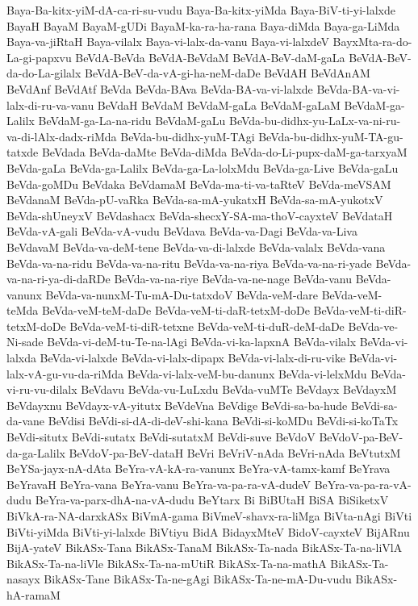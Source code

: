 {Baya-Ba-kitx-yiM-dA-ca-ri-su-vudu
Baya-Ba-kitx-yiMda
Baya-BiV-ti-yi-lalxde
BayaH
BayaM
BayaM-gUDi
BayaM-ka-ra-ha-rana
Baya-diMda
Baya-ga-LiMda
Baya-va-jiRtaH
Baya-vilalx
Baya-vi-lalx-da-vanu
Baya-vi-lalxdeV
BayxMta-ra-do-La-gi-papxvu
BeVdA-BeVda
BeVdA-BeVdaM
BeVdA-BeV-daM-gaLa
BeVdA-BeV-da-do-La-gilalx
BeVdA-BeV-da-vA-gi-ha-neM-daDe
BeVdAH
BeVdAnAM
BeVdAnf
BeVdAtf
BeVda
BeVda-BAva
BeVda-BA-va-vi-lalxde
BeVda-BA-va-vi-lalx-di-ru-va-vanu
BeVdaH
BeVdaM
BeVdaM-gaLa
BeVdaM-gaLaM
BeVdaM-ga-Lalilx
BeVdaM-ga-La-na-ridu
BeVdaM-gaLu
BeVda-bu-didhx-yu-LaLx-va-ni-ru-va-di-lAlx-dadx-riMda
BeVda-bu-didhx-yuM-TAgi
BeVda-bu-didhx-yuM-TA-gu-tatxde
BeVdada
BeVda-daMte
BeVda-diMda
BeVda-do-Li-pupx-daM-ga-tarxyaM
BeVda-gaLa
BeVda-ga-Lalilx
BeVda-ga-La-lolxMdu
BeVda-ga-Live
BeVda-gaLu
BeVda-goMDu
BeVdaka
BeVdamaM
BeVda-ma-ti-va-taRteV
BeVda-meVSAM
BeVdanaM
BeVda-pU-vaRka
BeVda-sa-mA-yukatxH
BeVda-sa-mA-yukotxV
BeVda-shUneyxV
BeVdashacx
BeVda-shecxY-SA-ma-thoV-cayxteV
BeVdataH
BeVda-vA-gali
BeVda-vA-vudu
BeVdava
BeVda-va-Dagi
BeVda-va-Liva
BeVdavaM
BeVda-va-deM-tene
BeVda-va-di-lalxde
BeVda-valalx
BeVda-vana
BeVda-va-na-ridu
BeVda-va-na-ritu
BeVda-va-na-riya
BeVda-va-na-ri-yade
BeVda-va-na-ri-ya-di-daRDe
BeVda-va-na-riye
BeVda-va-ne-nage
BeVda-vanu
BeVda-vanunx
BeVda-va-nunxM-Tu-mA-Du-tatxdoV
BeVda-veM-dare
BeVda-veM-teMda
BeVda-veM-teM-daDe
BeVda-veM-ti-daR-tetxM-doDe
BeVda-veM-ti-diR-tetxM-doDe
BeVda-veM-ti-diR-tetxne
BeVda-veM-ti-duR-deM-daDe
BeVda-ve-Ni-sade
BeVda-vi-deM-tu-Te-na-lAgi
BeVda-vi-ka-lapxnA
BeVda-vilalx
BeVda-vi-lalxda
BeVda-vi-lalxde
BeVda-vi-lalx-dipapx
BeVda-vi-lalx-di-ru-vike
BeVda-vi-lalx-vA-gu-vu-da-riMda
BeVda-vi-lalx-veM-bu-danunx
BeVda-vi-lelxMdu
BeVda-vi-ru-vu-dilalx
BeVdavu
BeVda-vu-LuLxdu
BeVda-vuMTe
BeVdayx
BeVdayxM
BeVdayxnu
BeVdayx-vA-yitutx
BeVdeVna
BeVdige
BeVdi-sa-ba-hude
BeVdi-sa-da-vane
BeVdisi
BeVdi-si-dA-di-deV-shi-kana
BeVdi-si-koMDu
BeVdi-si-koTaTx
BeVdi-situtx
BeVdi-sutatx
BeVdi-sutatxM
BeVdi-suve
BeVdoV
BeVdoV-pa-BeV-da-ga-Lalilx
BeVdoV-pa-BeV-dataH
BeVri
BeVriV-nAda
BeVri-nAda
BeVtutxM
BeYSa-jayx-nA-dAta
BeYra-vA-kA-ra-vanunx
BeYra-vA-tamx-kamf
BeYrava
BeYravaH
BeYra-vana
BeYra-vanu
BeYra-va-pa-ra-vA-dudeV
BeYra-va-pa-ra-vA-dudu
BeYra-va-parx-dhA-na-vA-dudu
BeYtarx
Bi
BiBUtaH
BiSA
BiSiketxV
BiVkA-ra-NA-darxkASx
BiVmA-gama
BiVmeV-shavx-ra-liMga
BiVta-nAgi
BiVti
BiVti-yiMda
BiVti-yi-lalxde
BiVtiyu
BidA
BidayxMteV
BidoV-cayxteV
BijARnu
BijA-yateV
BikASx-Tana
BikASx-TanaM
BikASx-Ta-nada
BikASx-Ta-na-liVlA
BikASx-Ta-na-liVle
BikASx-Ta-na-mUtiR
BikASx-Ta-na-mathA
BikASx-Ta-nasayx
BikASx-Tane
BikASx-Ta-ne-gAgi
BikASx-Ta-ne-mA-Du-vudu
BikASx-hA-ramaM
}
